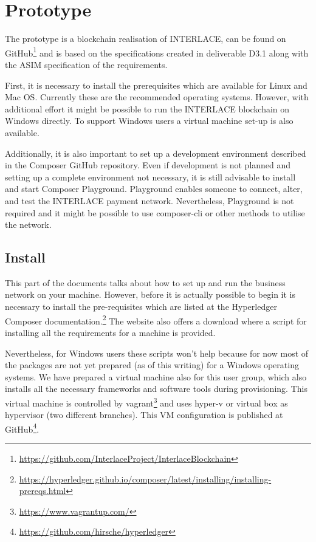 

\section{Prototype}
\label{sec:prototype}

The prototype is a blockchain realisation of INTERLACE, can be found on GitHub\footnote{\url{https://github.com/InterlaceProject/InterlaceBlockchain}} and is based on the specifications created in deliverable D3.1 \cite{INTERLACE_D31} along with the ASIM specification of the requirements.

First, it is necessary to install the prerequisites which are available for Linux and Mac OS. Currently these are the recommended operating systems. However, with additional effort it might be possible to run the INTERLACE blockchain on Windows directly. To support Windows users a virtual machine set-up is also available.

Additionally, it is also important to set up a development environment described in the Composer GitHub repository. Even if development is not planned and setting up a complete environment not necessary, it is still advisable to install and start Composer Playground. Playground enables someone to connect, alter, and test the INTERLACE payment network. Nevertheless, Playground is not required and it might be possible to use composer-cli or other methods to utilise the network.

\subsection{Install}
\label{subsec:install}
This part of the documents talks about how to set up and run the business network on your machine. However, before it is actually possible to begin it is necessary to install the pre-requisites which are listed at the Hyperledger Composer documentation.\footnote{\url{https://hyperledger.github.io/composer/latest/installing/installing-prereqs.html}} The website also offers a download where a script for installing all the requirements for a machine is provided.

Nevertheless, for Windows users these scripts won't help because for now most of the packages are not yet prepared (as of this writing) for a Windows operating systems. We have prepared a virtual machine also for this user group, which also installs all the necessary frameworks and software tools during provisioning. This virtual machine is controlled by vagrant\footnote{\url{https://www.vagrantup.com/}} and uses hyper-v or virtual box as hypervisor (two different branches). This VM configuration is published at GitHub\footnote{\url{https://github.com/hirsche/hyperledger}}.

